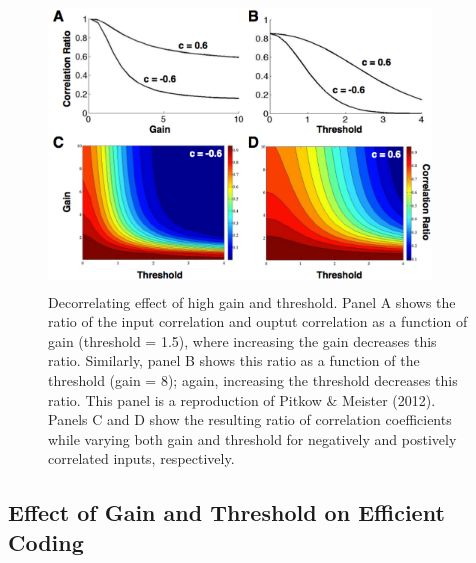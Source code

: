 \documentclass[12pt]{article}
\begin{document}
\begin{figure}[h!!]
\centerline{\includegraphics*[height = 3.0in,width=4.0in,angle=0]{GainThreshCorr.pdf}}
\label{Figure 1}
\caption{Decorrelating effect of high gain and threshold. Panel A shows the ratio of the input correlation and ouptut correlation as a function of gain (threshold = 1.5), where increasing the gain decreases this ratio. Similarly, panel B shows this ratio as a function of the threshold (gain = 8); again, increasing the threshold decreases this ratio. This panel is a reproduction of Pitkow \& Meister (2012). Panels C and D show the resulting ratio of correlation coefficients while varying both gain and threshold for negatively and postively correlated inputs, respectively. }
\end{figure}

\subsection{Effect of Gain and Threshold on Efficient Coding}
\end{document}
